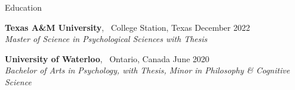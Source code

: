 \documentclass{resume} %
\begin{document}
\fancyhead[RO,LE]{\today}


%
%	
%	


\begin{rSection}{Education}
    
    {\textbf{Texas A\&M University}, \ College Station, Texas \hfill {December 
    2022}
    \\ \textit {Master of Science in Psychological Sciences with Thesis}}

    {\textbf{University of Waterloo}, \ Ontario, Canada \hfill 
    {June 2020}
    \\ \textit {Bachelor of Arts in Psychology, with Thesis, Minor in Philosophy \& Cognitive 
    Science}}

\end{rSection}

\end{document}
